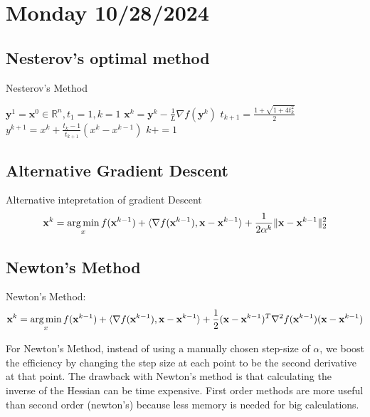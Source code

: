 \section{Monday 10/28/2024}
\subsection{Nesterov's optimal method}

\begin{algorithm}
  \caption{Nesterov's Method}\label{euclid}
  \begin{algorithmic}[1]
  \State $\textbf{y}^1 = \textbf{x}^0 \in \mathbb{R}^n, t_1 = 1, k = 1$
    \State $\textbf{x}^k = \textbf{y}^k - \frac{1}{L} \nabla f(\textbf{y}^k)$
    \State $t_{k+1} = \frac{1+ \sqrt{1+4t_k^2}}{2}$
    \State $y^{k+1} = x^k + \frac{t_k-1}{t_{k+1}}(x^k - x^{k-1})$
    \State $k += 1$
  \EndFor
  \end{algorithmic}
\end{algorithm}
\subsection{Alternative Gradient Descent}
Alternative intepretation of gradient Descent
\begin{equation}
  \textbf{x}^k = \operatorname*{arg\,min}_x f(\textbf{x}^{k-1}) + \langle \nabla f(\textbf{x}^{k-1}), \textbf{x} - \textbf{x}^{k-1} \rangle  + \frac{1}{2 \alpha^k} \| \textbf{x} - \textbf{x}^{k-1}\|_2^2
\end{equation}

\subsection{Newton's Method}
Newton's Method:
\begin{equation}
  \textbf{x}^k = \operatorname*{arg\,min}_x f(\textbf{x}^{k-1}) + \langle \nabla f(\textbf{x}^{k-1}), \textbf{x} - \textbf{x}^{k-1} \rangle  + \frac{1}{2} (\textbf{x} - \textbf{x}^{k-1})^T \nabla^2 f(\textbf{x}^{k-1}) (\textbf{x}- \textbf{x}^{k-1})
\end{equation}

For Newton's Method, instead of using a manually chosen step-size of $\alpha$, we boost the efficiency by changing the step size at each point to be the second derivative at that point. The drawback with Newton's method is that calculating the inverse of the Hessian can be time expensive. First order methods are more useful than second order (newton's) because less memory is needed for big calculations.

